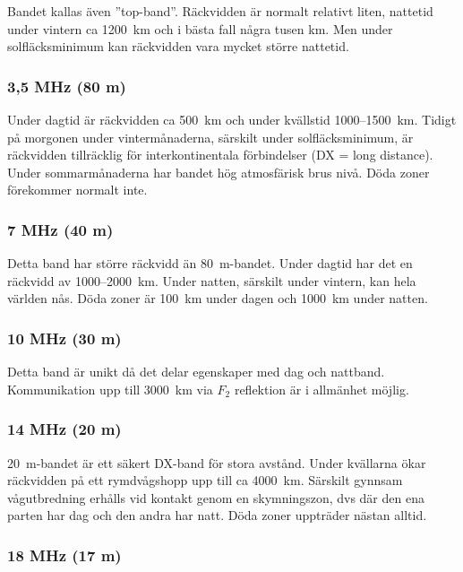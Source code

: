 Bandet kallas även ''top-band''.
Räckvidden är normalt relativt liten, nattetid under vintern ca 1200~km och i
bästa fall några tusen km.
Men under solfläcksminimum kan räckvidden vara mycket större nattetid.

\subsubsection{3,5 MHz (80 m)}

Under dagtid är räckvidden ca 500~km och under kvällstid 1000--1500~km.
Tidigt på morgonen under vintermånaderna, särskilt under solfläcksminimum, är
räckvidden tillräcklig för interkontinentala förbindelser (DX = long distance).
Under sommarmånaderna har bandet hög atmosfärisk brus nivå.
Döda zoner förekommer normalt inte.

\subsubsection{7 MHz (40 m)}

Detta band har större räckvidd än 80~m-bandet.
Under dagtid har det en räckvidd av 1000--2000~km.
Under natten, särskilt under vintern, kan hela världen nås.
Döda zoner är 100~km under dagen och 1000~km under natten.

\subsubsection{10 MHz (30 m)}

Detta band är unikt då det delar egenskaper med dag och nattband.
Kommunikation upp till 3000~km via \(F_2\) reflektion är i allmänhet möjlig.

\subsubsection{14 MHz (20 m)}

20~m-bandet är ett säkert DX-band för stora avstånd.
Under kvällarna ökar räckvidden på ett rymdvågshopp upp till ca 4000~km.
Särskilt gynnsam vågutbredning erhålls vid kontakt genom en skymningszon, dvs
där den ena parten har dag och den andra har natt.
Döda zoner uppträder nästan alltid.

\subsubsection{18 MHz (17 m)}


